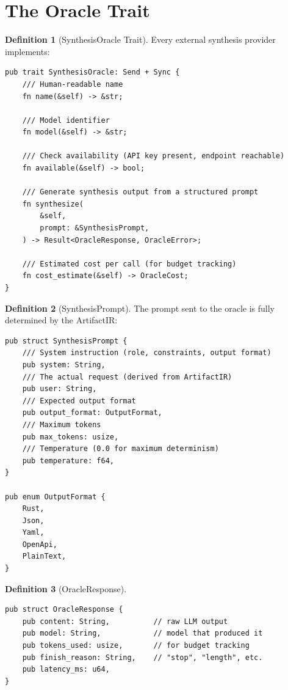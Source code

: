 \documentclass[11pt,a4paper,twoside]{article}
\theoremstyle{definition}
\newtheorem{definition}{Definition}[section]
\theoremstyle{plain}
\theoremstyle{remark}
\begin{document}
\section{The Oracle Trait}\label{sec:trait}

\begin{definition}[SynthesisOracle Trait]\label{def:oracletrait}
Every external synthesis provider implements:
\begin{lstlisting}
pub trait SynthesisOracle: Send + Sync {
    /// Human-readable name
    fn name(&self) -> &str;

    /// Model identifier
    fn model(&self) -> &str;

    /// Check availability (API key present, endpoint reachable)
    fn available(&self) -> bool;

    /// Generate synthesis output from a structured prompt
    fn synthesize(
        &self,
        prompt: &SynthesisPrompt,
    ) -> Result<OracleResponse, OracleError>;

    /// Estimated cost per call (for budget tracking)
    fn cost_estimate(&self) -> OracleCost;
}
\end{lstlisting}
\end{definition}

\begin{definition}[SynthesisPrompt]\label{def:prompt}
The prompt sent to the oracle is fully determined by the ArtifactIR:
\begin{lstlisting}
pub struct SynthesisPrompt {
    /// System instruction (role, constraints, output format)
    pub system: String,
    /// The actual request (derived from ArtifactIR)
    pub user: String,
    /// Expected output format
    pub output_format: OutputFormat,
    /// Maximum tokens
    pub max_tokens: usize,
    /// Temperature (0.0 for maximum determinism)
    pub temperature: f64,
}

pub enum OutputFormat {
    Rust,
    Json,
    Yaml,
    OpenApi,
    PlainText,
}
\end{lstlisting}
\end{definition}

\begin{definition}[OracleResponse]\label{def:response}
\begin{lstlisting}
pub struct OracleResponse {
    pub content: String,          // raw LLM output
    pub model: String,            // model that produced it
    pub tokens_used: usize,       // for budget tracking
    pub finish_reason: String,    // "stop", "length", etc.
    pub latency_ms: u64,
}
\end{lstlisting}
\end{definition}
\end{document}
